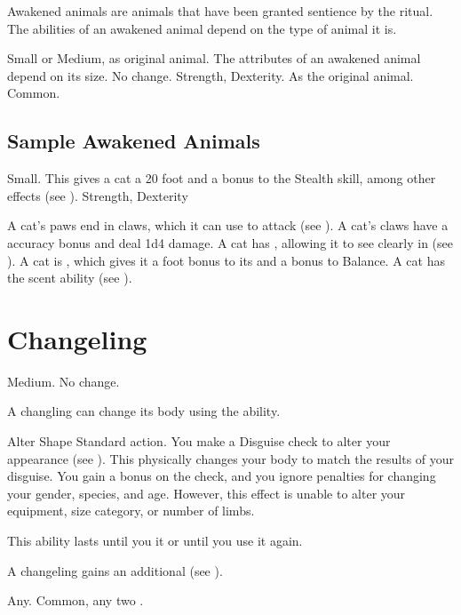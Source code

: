   Awakened animals are animals that have been granted sentience by the  ritual.
  The abilities of an awakened animal depend on the type of animal it is.

   Small or Medium, as original animal.
   The attributes of an awakened animal depend on its size.
   No change.
    Strength,  Dexterity.
   As the original animal.
   Common.

  \subsection{Sample Awakened Animals}


     Small. This gives a cat a 20 foot  and a  bonus to the Stealth skill, among other effects (see ).
      Strength,  Dexterity
    \begin{itemize}
       A cat's paws end in claws, which it can use to attack (see ). A cat's claws have a  accuracy bonus and deal 1d4 damage.
       A cat has , allowing it to see clearly in  (see ).
       A cat is , which gives it a  foot bonus to its  and a  bonus to Balance.
       A cat has the scent ability (see ).
    \end{itemize}

\section{Changeling}

   Medium.
   No change.
  \begin{itemize}
     A changling can change its body using the  ability.
      \begin{activeability}{Alter Shape}
        \abilityusagetime Standard action.
        \rankline
        You make a Disguise check to alter your appearance (see ).
        This physically changes your body to match the results of your disguise.
        You gain a  bonus on the check, and you ignore penalties for changing your gender, species, and age.
        However, this effect is unable to alter your equipment, size category, or number of limbs.

        This ability lasts until you  it or until you use it again.
      \end{activeability}
     A changeling gains an additional  (see ).
  \end{itemize}
   Any.
   Common, any two .

